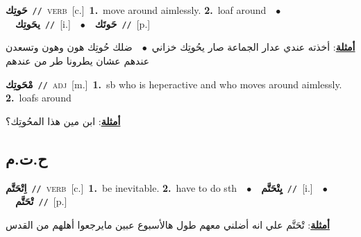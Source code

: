 \documentclass[10pt,a4paper,twoside]{article} %
\begin{document}
\begin{multicols}{2}
{{{{{{{{{{\setlength\topsep{0pt}\textbf{\foreignlanguage{arabic}{حَوتِك}}\ {\color{gray}\texttt{//}\color{black}}\ \textsc{verb}\ [c.]\ \textbf{1.}~move around aimlessly.  \textbf{2.}~loaf around\ \ $\bullet$\ \ \setlength\topsep{0pt}\textbf{\foreignlanguage{arabic}{يحَوتِك}}\ {\color{gray}\texttt{//}\color{black}}\ [i.]\ \ $\bullet$\ \ \setlength\topsep{0pt}\textbf{\foreignlanguage{arabic}{حَوتَك}}\ {\color{gray}\texttt{//}\color{black}}\ [p.]\  \begin{flushright}\color{gray}\foreignlanguage{arabic}{\textbf{\underline{\foreignlanguage{arabic}{أمثلة}}}: أخذته عندي عدار الجماعة صار يحُوتِك خزاني\ $\bullet$\ \  ضلك حُوتِك هون وهون وتسعدن عندهم عشان يطرونا طر من عندهم}\end{flushright}\color{black}} \vspace{2mm}

{\setlength\topsep{0pt}\textbf{\foreignlanguage{arabic}{مْحَوتِك}}\ {\color{gray}\texttt{//}\color{black}}\ \textsc{adj}\ [m.]\ \textbf{1.}~sb who is heperactive and who moves around aimlessly.  \textbf{2.}~loafs around\  \begin{flushright}\color{gray}\foreignlanguage{arabic}{\textbf{\underline{\foreignlanguage{arabic}{أمثلة}}}: ابن مين هذا المحُوتِك؟}\end{flushright}\color{black}} \vspace{2mm}

\vspace{-3mm}
\subsection*{\color{blue}\foreignlanguage{arabic}{ح.ت.م}\color{blue}{}} 

{\setlength\topsep{0pt}\textbf{\foreignlanguage{arabic}{اِتْحَتَّم}}\ {\color{gray}\texttt{//}\color{black}}\ \textsc{verb}\ [c.]\ \textbf{1.}~be inevitable.  \textbf{2.}~have to do sth\ \ $\bullet$\ \ \setlength\topsep{0pt}\textbf{\foreignlanguage{arabic}{يِتْحَتَّم}}\ {\color{gray}\texttt{//}\color{black}}\ [i.]\ \ $\bullet$\ \ \setlength\topsep{0pt}\textbf{\foreignlanguage{arabic}{تْحَتَّم}}\ {\color{gray}\texttt{//}\color{black}}\ [p.]\  \begin{flushright}\color{gray}\foreignlanguage{arabic}{\textbf{\underline{\foreignlanguage{arabic}{أمثلة}}}: تْحَتَّم علي انه أضلني معهم طول هالأسبوع عبين مايرجعوا أهلهم من القدس}\end{flushright}\color{black}} \vspace{2mm}

}}}}}}}}}
\end{multicols}
\end{document}
